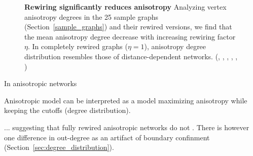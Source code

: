 \begin{figure}[H]
  \centering
  \captionsetup{skip=15pt}
  \caption{\textbf{Rewiring significantly reduces anisotropy}
    Analyzing vertex anisotropy degrees in the 25 sample graphs
    (Section~\ref{sample_graphs}) and their rewired versions, we find
    that the mean anisotropy degree decrease with increasing rewiring
    factor $\eta$. In completely rewired graphs ($\eta=1$), anisotropy
    degree distribution resembles those of distance-dependent
    networks. (, ,
    , , ,
    )}
  \label{fig:anisotropy_degree} 
\end{figure}


In anisotropic networks


Anisotropic model can be interpreted as a model maximizing anisotropy
while keeping the cutoffs (degree distribution).


... suggesting that fully rewired anisotropic networks do not . There
is however one difference in out-degree as an artifact of boundary
confinment (Section~\ref{sec:degree_distribution}).



